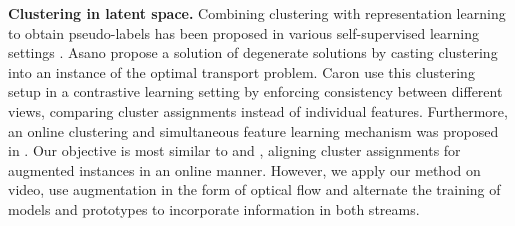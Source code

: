 \documentclass[10pt,twocolumn,letterpaper]{article}
\begin{document}
\textbf{Clustering in latent space.} Combining clustering with representation learning to obtain pseudo-labels has been proposed in various self-supervised learning settings \cite{yan_clusterfit_2020, caron_deep_2018, asano_labelling_2020, caron_unsupervised_2020, li_prototypical_2021}. Asano \etal \cite{asano_self-labelling_2020} propose a solution of degenerate solutions by casting clustering into an instance of the optimal transport problem. Caron \etal \cite{caron_unsupervised_2020} use this clustering setup in a contrastive learning setting by enforcing consistency between different views, comparing cluster assignments instead of individual features. Furthermore, an online clustering and simultaneous feature learning mechanism was proposed in \cite{zhan_online_2020}. Our objective is most similar to \cite{caron_unsupervised_2020} and \cite{li_prototypical_2021}, aligning cluster assignments for augmented instances in an online manner. However, we apply our method on video, use augmentation in the form of optical flow and alternate the training of models and prototypes to incorporate information in both streams.
\end{document}
